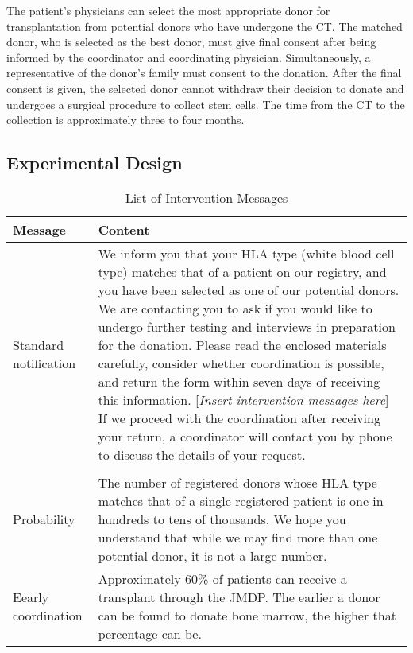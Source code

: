 \documentclass[12pt, a4paper]{article}
\begin{document}
The patient's physicians can select the most appropriate donor for transplantation from potential donors who have undergone the CT. The matched donor, who is selected as the best donor, must give final consent after being informed by the coordinator and coordinating physician. Simultaneously, a representative of the donor's family must consent to the donation. After the final consent is given, the selected donor cannot withdraw their decision to donate and undergoes a surgical procedure to collect stem cells. The time from the CT to the collection is approximately three to four months.

\hypertarget{design}{%
\subsection{Experimental Design}\label{design}}

\begin{table}

\caption{\label{tab:list-message}List of Intervention Messages}
\centering
\fontsize{8}{10}\selectfont
\begin{tabular}[t]{l>{\raggedright\arraybackslash}p{40em}}
\toprule
Message & Content\\
\midrule
Standard notification & We inform you that your HLA type (white blood cell type) matches that of a patient on our registry, and you have been selected as one of our potential donors. We are contacting you to ask if you would like to undergo further testing and interviews in preparation for the donation. Please read the enclosed materials carefully, consider whether coordination is possible, and return the form within seven days of receiving this information. [\emph{Insert intervention messages here}] If we proceed with the coordination after receiving your return, a coordinator will contact you by phone to discuss the details of your request.\\
\addlinespace[0.3em]
\multicolumn{2}{l}{\textbf{Intervention message}}\\
\hspace{1em}Probability & The number of registered donors whose HLA type matches that of a single registered patient is one in hundreds to tens of thousands. We hope you understand that while we may find more than one potential donor, it is not a large number.\\
\hspace{1em}Eearly coordination & Approximately 60\% of patients can receive a transplant through the JMDP. The earlier a donor can be found to donate bone marrow, the higher that percentage can be.\\
\bottomrule
\end{tabular}
\end{table}
\end{document}
